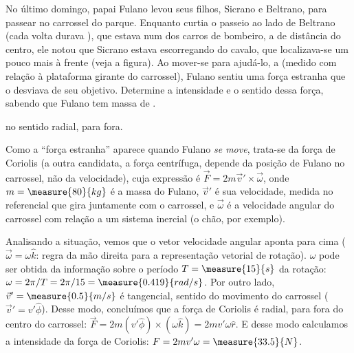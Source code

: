 \begin{question}
	No último domingo, papai Fulano levou seus filhos, Sicrano e Beltrano, para passear no carrossel do parque.
	Enquanto curtia o passeio ao lado de Beltrano (cada volta durava ), que estava num dos carros de bombeiro, a  de distância do centro, ele notou que Sicrano estava escorregando do cavalo, que localizava-se um pouco mais à frente (veja a figura).
	Ao mover-se para ajudá-lo, a  (medido com relação à plataforma girante do carrossel), Fulano sentiu uma força estranha que o desviava de seu objetivo.
	Determine a intensidade e o sentido dessa força, sabendo que Fulano tem massa de .


	\begin{answer}
		 no sentido radial, para fora.
	\end{answer}

	\begin{solution}
		Como a ``força estranha'' aparece quando Fulano \emph{se move}, trata-se da força de Coriolis (a outra candidata, a força centrífuga, depende da posição de Fulano no carrossel, não da velocidade), cuja expressão é $\vec F = 2m\vec v' \times \vec \omega$, onde $m = \measure{80}{kg}$ é a massa do Fulano, $\vec v'$ é sua velocidade, medida no referencial que gira juntamente com o carrossel, e $\vec\omega$ é a velocidade angular do carrossel com relação a um sistema inercial (o chão, por exemplo).

		Analisando a situação, vemos que o vetor velocidade angular aponta para cima ($\vec\omega = \omega\hat k$: regra da mão direita para a representação vetorial de rotação). $\omega$ pode ser obtida da informação sobre o período $T = \measure{15}{s}$ da rotação: $\omega = 2\pi/T = 2\pi/15 = \measure{0.419}{rad/s}$. Por outro lado, $\vec v' = \measure{0.5}{m/s}$ é tangencial, sentido do movimento do carrossel ($\vec v' = v'\hat \phi$).
		Desse modo, concluímos que a força de Coriolis é radial, para fora do centro do carrossel: $\vec F = 2m(v'\hat \phi)\times(\omega \hat k) = 2mv'\omega \hat r$. E desse modo calculamos a intensidade da força de Coriolis: $F = 2mv'\omega = \measure{33.5}{N}$.
	\end{solution}
\end{question}